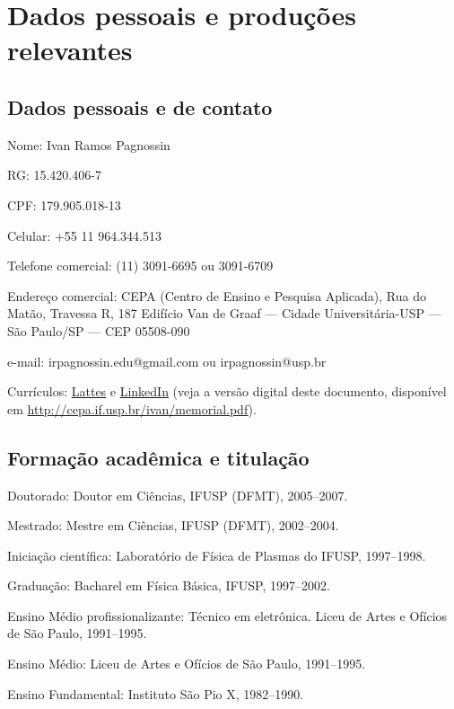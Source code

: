 \section{Dados pessoais e produções relevantes}
\label{cap:resumo}
\small

\subsection{Dados pessoais e de contato}

\begin{compactdesc}
  \item[Nome:] Ivan Ramos Pagnossin
  \item[RG:] 15.420.406-7
  \item[CPF:] 179.905.018-13
  \item[Celular:] +55 11 964.344.513
  \item[Telefone comercial:] (11) 3091-6695 ou 3091-6709
  \item[Endereço comercial:] CEPA (Centro de Ensino e Pesquisa Aplicada), Rua do Matão, Travessa R, 187
  Edifício Van de Graaf --- Cidade Universitária-USP --- São Paulo/SP --- CEP 05508-090
  \item[e-mail:] irpagnossin.edu@gmail.com ou irpagnossin@usp.br
  \item[Currículos:] \href{http://lattes.cnpq.br/6688104156301227}{Lattes} e \href{http://br.linkedin.com/in/irpagnossin}{LinkedIn} (veja a versão digital deste documento, disponível em \url{http://cepa.if.usp.br/ivan/memorial.pdf}).
\end{compactdesc}

\subsection{Formação acadêmica e titulação}

\begin{compactdesc}
  \item[Doutorado:] Doutor em Ciências, IFUSP (DFMT), 2005--2007.
  \item[Mestrado:] Mestre em Ciências, IFUSP (DFMT), 2002--2004.
  \item[Iniciação científica:] Laboratório de Física de Plasmas do IFUSP, 1997--1998.
  \item[Graduação:] Bacharel em Física Básica, IFUSP, 1997--2002.
  \item[Ensino Médio profissionalizante:] Técnico em eletrônica. Liceu de Artes e Ofícios de São Paulo, 1991--1995.
  \item[Ensino Médio:] Liceu de Artes e Ofícios de São Paulo, 1991--1995.
  \item[Ensino Fundamental:] Instituto São Pio X, 1982--1990.
\end{compactdesc}

